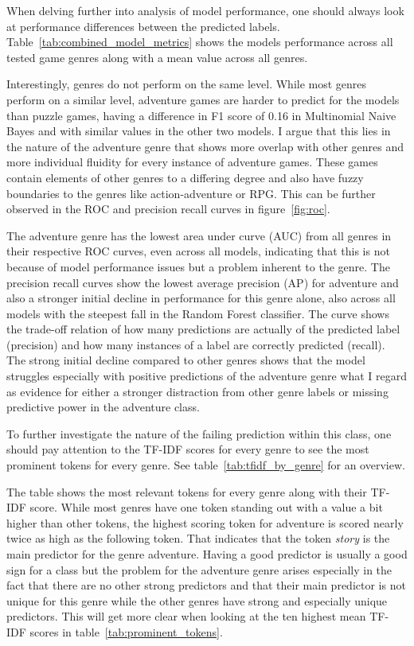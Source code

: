 \documentclass[11pt, a4paper]{article}
\begin{document}
When delving further into analysis of model performance, one should always look at performance differences between
the predicted labels.
Table~\ref{tab:combined_model_metrics} shows the models performance across all tested game genres along with a mean
value across all genres.



Interestingly, genres do not perform on the same level.
While most genres perform on a similar level, adventure games are harder to predict for the models than puzzle games,
having a difference in F1 score of 0.16 in Multinomial Naive Bayes and with similar values in the other two models.
I argue that this lies in the nature of the adventure genre that shows more overlap with other genres and more
individual fluidity for every instance of adventure games.
These games contain elements of other genres to a differing degree and also have fuzzy boundaries to the genres like
action-adventure or RPG.
This can be further observed in the ROC and precision recall curves in figure~\ref{fig:roc}.



The adventure genre has the lowest area under curve (AUC) from all genres in their respective ROC curves, even across
all models, indicating that this is not because of model performance issues but a problem inherent to the genre.
The precision recall curves show the lowest average precision (AP) for adventure and also a stronger initial decline in
performance for this genre alone, also across all models with the steepest fall in the Random Forest classifier.
The curve shows the trade-off relation of how many predictions are actually of the predicted label (precision) and how
many instances of a label are correctly predicted (recall).
The strong initial decline compared to other genres shows that the model struggles especially with positive predictions
of the adventure genre what I regard as evidence for either a stronger distraction from other genre labels or missing
predictive power in the adventure class.

To further investigate the nature of the failing prediction within this class, one should pay attention to the TF-IDF
scores for every genre to see the most prominent tokens for every genre.
See table~\ref{tab:tfidf_by_genre} for an overview.



The table shows the most relevant tokens for every genre along with their TF-IDF score.
While most genres have one token standing out with a value a bit higher than other tokens, the highest scoring token for
adventure is scored nearly twice as high as the following token.
That indicates that the token \textit{story} is the main predictor for the genre adventure.
Having a good predictor is usually a good sign for a class but the problem for the adventure genre arises especially in
the fact that there are no other strong predictors and that their main predictor is not unique for this genre while
the other genres have strong and especially unique predictors.
This will get more clear when looking at the ten highest mean TF-IDF scores in table~\ref{tab:prominent_tokens}.
\end{document}
